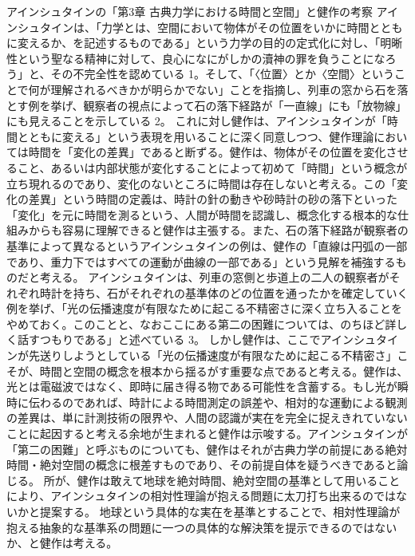 \documentclass{article}
\begin{document}
アインシュタインの「第3章 古典力学における時間と空間」と健作の考察
アインシュタインは、「力学とは、空間において物体がその位置をいかに時間とともに変えるか、を記述するものである」という力学の目的の定式化に対し、「明晰性という聖なる精神に対して、良心になにがしかの瀆神の罪を負うことになろう」と、その不完全性を認めている 1。そして、「〈位置〉とか〈空間〉ということで何が理解されるべきかが明らかでない」ことを指摘し、列車の窓から石を落とす例を挙げ、観察者の視点によって石の落下経路が「一直線」にも「放物線」にも見えることを示している 2。
これに対し健作は、アインシュタインが「時間とともに変える」という表現を用いることに深く同意しつつ、健作理論においては時間を「変化の差異」であると断ずる。健作は、物体がその位置を変化させること、あるいは内部状態が変化することによって初めて「時間」という概念が立ち現れるのであり、変化のないところに時間は存在しないと考える。この「変化の差異」という時間の定義は、時計の針の動きや砂時計の砂の落下といった「変化」を元に時間を測るという、人間が時間を認識し、概念化する根本的な仕組みからも容易に理解できると健作は主張する。また、石の落下経路が観察者の基準によって異なるというアインシュタインの例は、健作の「直線は円弧の一部であり、重力下ではすべての運動が曲線の一部である」という見解を補強するものだと考える。
アインシュタインは、列車の窓側と歩道上の二人の観察者がそれぞれ時計を持ち、石がそれぞれの基準体のどの位置を通ったかを確定していく例を挙げ、「光の伝播速度が有限なために起こる不精密さに深く立ち入ることをやめておく。このことと、なおここにある第二の困難については、のちほど詳しく話すつもりである」と述べている 3。
しかし健作は、ここでアインシュタインが先送りしようとしている「光の伝播速度が有限なために起こる不精密さ」こそが、時間と空間の概念を根本から揺るがす重要な点であると考える。健作は、光とは電磁波ではなく、即時に届き得る物である可能性を含蓄する。もし光が瞬時に伝わるのであれば、時計による時間測定の誤差や、相対的な運動による観測の差異は、単に計測技術の限界や、人間の認識が実在を完全に捉えきれていないことに起因すると考える余地が生まれると健作は示唆する。アインシュタインが「第二の困難」と呼ぶものについても、健作はそれが古典力学の前提にある絶対時間・絶対空間の概念に根差すものであり、その前提自体を疑うべきであると論じる。
所が、健作は敢えて地球を絶対時間、絶対空間の基準として用いることにより、アインシュタインの相対性理論が抱える問題に太刀打ち出来るのではないかと提案する。 地球という具体的な実在を基準とすることで、相対性理論が抱える抽象的な基準系の問題に一つの具体的な解決策を提示できるのではないか、と健作は考える。
\end{document}
